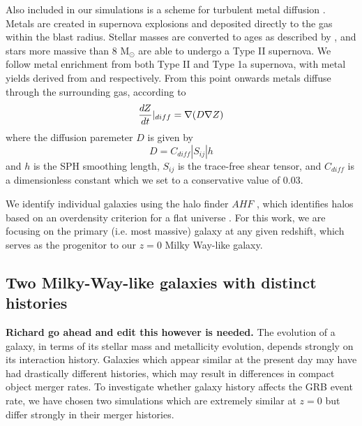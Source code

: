 \documentclass[nofootinbib,twocolumn,prd]{emulateapj}
\begin{document}
Also included in our simulations is a scheme for turbulent metal
diffusion \citep{2010MNRAS.407.1581S}.  Metals are created in supernova explosions
and deposited directly to the gas within the blast radius.  Stellar
masses are converted to ages as described by \citet{1996A&A...315..105R}, and
stars more massive than 8 M$_\odot$ are able to undergo a Type II
supernova.  We follow metal enrichment from both Type II and Type 1a
supernova, with metal yields derived from \citet{1993PhR...227...65W} and
\citet{1986A&A...158...17T} respectively.  From this point onwards metals
diffuse through the surrounding gas, according to 
\begin{equation}
\frac{dZ}{dt}|_{diff} = \nabla (D \nabla {Z}) \\
\end{equation}
%
where the diffusion paremeter $D$ is given by
%
\begin{equation}
D = C_{diff} |S_{ij}| h
\end{equation}
%
and $h$ is the SPH smoothing length, $S_{ij}$ is the trace-free shear
tensor, and $C_{diff}$ is a dimensionless constant which we set to a conservative value of 0.03.  


We identify individual galaxies using the halo finder $AHF$
\citep{2004MNRAS.351..399G,2009ApJS..182..608K}, which identifies halos based on an
overdensity criterion for a flat universe \citep{1997PhDT........14G}.  For this
work, we are focusing on the primary (i.e. most massive) galaxy at any
given redshift, which serves as the progenitor to our $z = 0$ Milky
Way-like galaxy.



\subsection{Two Milky-Way-like galaxies with distinct histories }

{\bf Richard go ahead and edit this however is needed.}  The evolution
of a galaxy, in terms of its stellar mass and metallicity evolution,
depends strongly on its interaction history.  Galaxies which appear
similar at the present day may have had drastically different
histories, which may result in differences in compact object merger
rates.  To investigate whether galaxy history affects the GRB event
rate, we have chosen two simulations which are extremely similar at $z
= 0$ but differ strongly in their merger histories.
\end{document}
